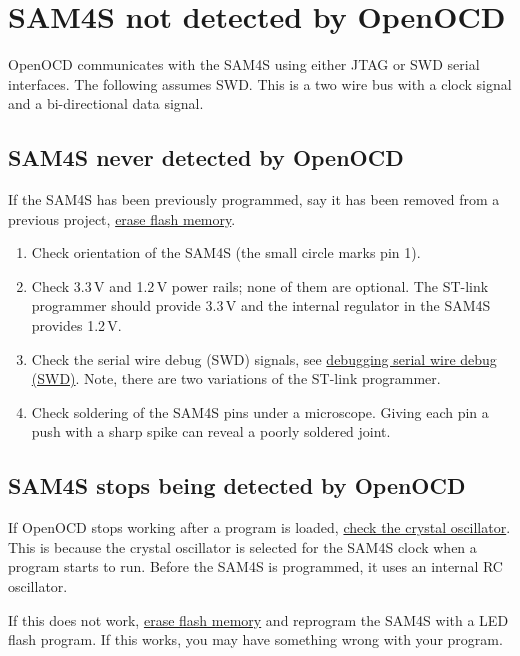 \section{SAM4S not detected by OpenOCD}
\label{sam4s-not-detected-by-openocd}

OpenOCD communicates with the SAM4S using either JTAG or SWD serial
interfaces.  The following assumes SWD.  This is a two wire bus with a
clock signal and a bi-directional data signal.


\subsection{SAM4S never detected by OpenOCD}

If the SAM4S has been previously programmed, say it has been removed
from a previous project, \hyperref[erasing-flash-memory]{erase flash
  memory}.

%
\begin{enumerate}
\item
  Check orientation of the SAM4S (the small circle marks pin 1).

\item
  Check 3.3\,V and 1.2\,V power rails; none of them are optional.  The
  ST-link programmer should provide 3.3\,V and the internal regulator
  in the SAM4S provides 1.2\,V.

\item
  Check the serial wire debug (SWD) signals, see
  \protect\hyperref[debugging]{debugging serial wire debug (SWD)}.
  Note, there are two variations of the ST-link programmer.

\item
  Check soldering of the SAM4S pins under a microscope.  Giving
  each pin a push with a sharp spike can reveal a poorly soldered joint.

\end{enumerate}


\subsection{SAM4S stops being detected by OpenOCD}

If OpenOCD stops working after a program is loaded,
\protect\hyperref[checking-the-crystal-oscillator]{check the crystal
  oscillator}.  This is because the crystal oscillator is selected for
the SAM4S clock when a program starts to run.  Before the SAM4S is
programmed, it uses an internal RC oscillator.

If this does not work, \hyperref[erasing-flash-memory]{erase flash
  memory} and reprogram the SAM4S with a LED flash program.  If this
works, you may have something wrong with your program.


